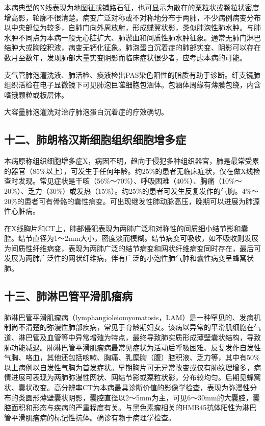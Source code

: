 本病典型的X线表现为地图征或铺路石征，也可显示为散在的粟粒状或颗粒状密度增高影，轮廓不很清楚。病变广泛对称或不对称地分布于两肺，不少病例病变分布以中央部位为较多，自肺门向外周放射，形成蝶翼状影，类似肺泡性肺水肿。与肺水肿不同点为本病一般无心脏扩大、肺淤血和间质性肺水肿征象。通常无肺门淋巴结肿大或胸腔积液，病变无钙化征象。肺泡蛋白沉着症的肺部实变、阴影可以存在数月至数年，发现肺部大量实变阴影而临床症状很少者，应考虑本病的可能。

支气管肺泡灌洗液、肺活检、痰液检出PAS染色阳性的脂质有助于诊断。纤支镜肺组织活检在电子显微镜下可见肺泡巨噬细胞包涵体。包涵体周缘有薄膜包绕，内含嗜锇颗粒或板层体。

大容量肺泡灌洗对治疗肺泡蛋白沉着症的疗效确切。

\subsection{十二、肺朗格汉斯细胞组织细胞增多症}

本病原称组织细胞增多症X，病因不明，趋向于侵犯多种组织器官，肺是最常受累的器官（85\%以上），可发生于任何年龄。约25\%的患者无临床症状，仅在做X线检查时发现。常见症状是干咳（56\%～70\%）、呼吸困难（40\%）、胸痛（10\%～20\%）、乏力（30\%）或发热（15\%）。约25\%的患者可发生反复发作的气胸。4\%～20\%的患者可有骨骼的囊性病变。可出现继发性肺动脉高压，晚期可以进展为肺源性心脏病。

在X线胸片和CT上，肺部侵犯表现为两肺广泛和对称性的间质细小结节影和囊腔。结节直径为1～2mm大小，密度淡而模糊。结节病变可吸收，如不吸收则发展为间质性纤维病变，表现为两肺广泛的结节病变和网状纤维病变同时存在，最后可发展为两肺广泛性的网状纤维病，伴有广泛的小泡性肺气肿和囊性病变呈蜂窝状肺。

\subsection{十三、肺淋巴管平滑肌瘤病}

肺淋巴管平滑肌瘤病（lymphangioleiomyomatosis，LAM）是一种罕见的、发病机制尚不清楚的弥漫性肺部疾病，常见于育龄期妇女。该病以异常的平滑肌细胞在气道、淋巴管及血管等中异常增殖为特点，最终导致肺实质形成薄壁囊状结构，导致肺功能减退。肺淋巴管平滑肌瘤病最常见症状为活动后呼吸困难、反复发作自发性气胸、咯血，其他还包括咳嗽、胸痛、乳糜胸（腹）腔积液、乏力等，其中有50\%以上病例以自发性气胸为首发症状。早期胸片可无异常改变或仅有肺纹理增多，病情进展可表现为两肺弥漫性网状、网结节影或粟粒状影，分布较均匀。后期见蜂窝状、囊状改变。高分辨率CT为本病最具诊断价值的影像学检查，表现为弥漫性分布的类圆形薄壁囊状阴影，囊腔直径以2～5mm为主，可见6～30mm的大囊腔，囊腔面积和形态与疾病的严重程度有关。与黑色素瘤相关的HMB45抗体阳性为淋巴管平滑肌瘤病的标记性抗体。确诊有赖于病理学检查。


